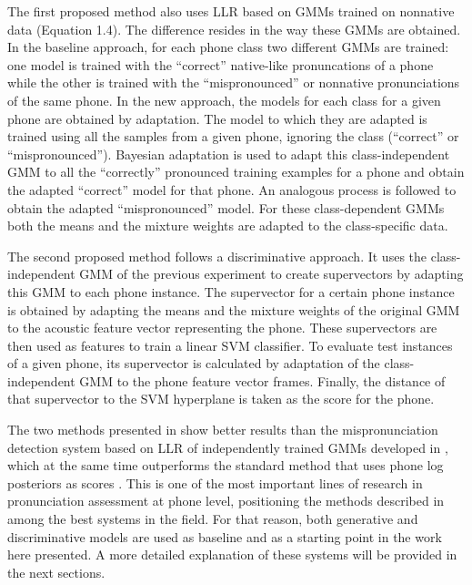 The first proposed method also uses LLR based on GMMs trained
on nonnative data (Equation 1.4). The difference resides in the way these GMMs are obtained.
In the baseline approach, for each phone class two different GMMs are trained: one model is
trained with the ``correct'' native-like pronuncations of a phone while the other is trained
with the ``mispronounced'' or nonnative pronunciations of the same phone. In the new approach,
the models for each class for a given phone are obtained by adaptation. The model to which they
are adapted is trained using all the samples from a given phone, ignoring the class (``correct''
or ``mispronounced''). Bayesian adaptation \cite{ubm} is used to adapt this class-independent
GMM to all the ``correctly'' pronounced training examples for a phone and obtain the adapted
``correct'' model for that phone. An analogous process is followed to obtain the adapted
``mispronounced'' model. For these class-dependent GMMs both the means and the mixture weights 
are adapted to the class-specific data.

The second proposed method follows a discriminative approach. It uses the class-independent
GMM of the previous experiment to create supervectors by adapting this GMM to each phone instance.
The supervector for a certain phone instance is obtained by adapting the means and the mixture
weights of the original GMM to the acoustic feature vector representing the phone.
These supervectors are then used as features to train a linear SVM classifier.
To evaluate test instances of a given phone, its supervector is calculated by adaptation of the class-independent
GMM to the phone feature vector frames. Finally, the distance of that supervector to the SVM
hyperplane is taken as the score for the phone.

The two methods presented in \cite{main} show better results than the mispronunciation
detection system based on LLR of independently trained GMMs developed in
\cite{detection_phone_level_mispronunciation_learning}, which at the same time
outperforms the standard method that uses phone log posteriors
as scores \cite{pronunciation_scoring_phone_segments_instruction}. 
This is one of the most important lines of research in pronunciation assessment 
at phone level, positioning the methods described in \cite{main} among the best
systems in the field. For that reason, both generative and discriminative models are 
used as baseline and as a starting point in the work here presented. A more detailed 
explanation of these systems will be provided in the next sections.


